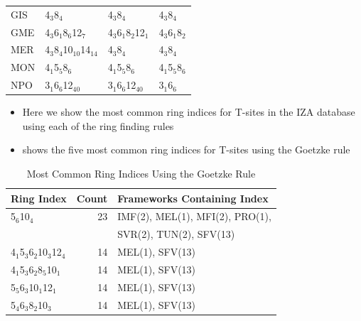 \documentclass[11pt]{article}
\begin{document}
\begin{table}[htbp]
\begin{tabular}{llll}
GIS & 4\(_{\text{3}}\)\textbullet{}8\(_{\text{4}}\) & 4\(_{\text{3}}\)\textbullet{}8\(_{\text{4}}\) & 4\(_{\text{3}}\)\textbullet{}8\(_{\text{4}}\)\\
GME & 4\(_{\text{3}}\)\textbullet{}6\(_{\text{1}}\)\textbullet{}8\(_{\text{6}}\)\textbullet{}12\(_{\text{7}}\) & 4\(_{\text{3}}\)\textbullet{}6\(_{\text{1}}\)\textbullet{}8\(_{\text{2}}\)\textbullet{}12\(_{\text{1}}\) & 4\(_{\text{3}}\)\textbullet{}6\(_{\text{1}}\)\textbullet{}8\(_{\text{2}}\)\\
MER & 4\(_{\text{3}}\)\textbullet{}8\(_{\text{4}}\)\textbullet{}10\(_{\text{10}}\)\textbullet{}14\(_{\text{14}}\) & 4\(_{\text{3}}\)\textbullet{}8\(_{\text{4}}\) & 4\(_{\text{3}}\)\textbullet{}8\(_{\text{4}}\)\\
MON & 4\(_{\text{1}}\)\textbullet{}5\(_{\text{5}}\)\textbullet{}8\(_{\text{6}}\) & 4\(_{\text{1}}\)\textbullet{}5\(_{\text{5}}\)\textbullet{}8\(_{\text{6}}\) & 4\(_{\text{1}}\)\textbullet{}5\(_{\text{5}}\)\textbullet{}8\(_{\text{6}}\)\\
NPO & 3\(_{\text{1}}\)\textbullet{}6\(_{\text{6}}\)\textbullet{}12\(_{\text{40}}\) & 3\(_{\text{1}}\)\textbullet{}6\(_{\text{6}}\)\textbullet{}12\(_{\text{40}}\) & 3\(_{\text{1}}\)\textbullet{}6\(_{\text{6}}\)\\
\end{tabular}
\end{table}


\begin{itemize}
\item Here we show the most common ring indices for T-sites in the IZA database using each of the ring finding rules
\item {} shows the five most common ring indices for T-sites using the Goetzke  rule
\end{itemize}
\begin{table}[htbp]
\caption{Most Common Ring Indices Using the Goetzke Rule \label{tab:goetzke-ts}}
\centering
\begin{tabular}{lrl}
Ring Index & Count & Frameworks Containing Index\\
\hline
5\(_{\text{6}}\)\textbullet{}10\(_{\text{4}}\) & 23 & IMF(2), MEL(1), MFI(2), PRO(1),\\
 &  & SVR(2), TUN(2), SFV(13)\\
4\(_{\text{1}}\)\textbullet{}5\(_{\text{3}}\)\textbullet{}6\(_{\text{2}}\)\textbullet{}10\(_{\text{3}}\)\textbullet{}12\(_{\text{4}}\) & 14 & MEL(1), SFV(13)\\
4\(_{\text{1}}\)\textbullet{}5\(_{\text{3}}\)\textbullet{}6\(_{\text{2}}\)\textbullet{}8\(_{\text{5}}\)\textbullet{}10\(_{\text{1}}\) & 14 & MEL(1), SFV(13)\\
5\(_{\text{5}}\)\textbullet{}6\(_{\text{3}}\)\textbullet{}10\(_{\text{1}}\)\textbullet{}12\(_{\text{1}}\) & 14 & MEL(1), SFV(13)\\
5\(_{\text{4}}\)\textbullet{}6\(_{\text{3}}\)\textbullet{}8\(_{\text{2}}\)\textbullet{}10\(_{\text{3}}\) & 14 & MEL(1), SFV(13)\\
\end{tabular}
\end{table}
\end{document}

